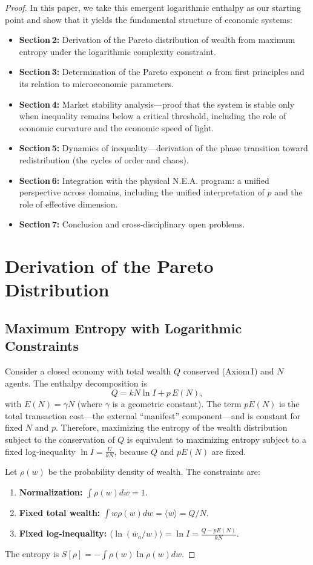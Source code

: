 \documentclass{article}
\begin{document}
\begin{proof}
In this paper, we take this emergent logarithmic enthalpy as our starting point and show that it yields the fundamental structure of economic systems:
\begin{itemize}
    \item \textbf{Section 2:} Derivation of the Pareto distribution of wealth from maximum entropy under the logarithmic complexity constraint.
    \item \textbf{Section 3:} Determination of the Pareto exponent $\alpha$ from first principles and its relation to microeconomic parameters.
    \item \textbf{Section 4:} Market stability analysis—proof that the system is stable only when inequality remains below a critical threshold, including the role of economic curvature and the economic speed of light.
    \item \textbf{Section 5:} Dynamics of inequality—derivation of the phase transition toward redistribution (the cycles of order and chaos).
    \item \textbf{Section 6:} Integration with the physical N.E.A. program: a unified perspective across domains, including the unified interpretation of $p$ and the role of effective dimension.
    \item \textbf{Section 7:} Conclusion and cross‑disciplinary open problems.
\end{itemize}

\section{Derivation of the Pareto Distribution}
\subsection{Maximum Entropy with Logarithmic Constraints}
Consider a closed economy with total wealth $Q$ conserved (Axiom I) and $N$ agents. The enthalpy decomposition is
\[
Q = k N \ln I + p\,E(N),
\]
with $E(N) = \gamma N$ (where $\gamma$ is a geometric constant). The term $pE(N)$ is the total transaction cost—the external “manifest” component—and is constant for fixed $N$ and $p$. Therefore, maximizing the entropy of the wealth distribution subject to the conservation of $Q$ is equivalent to maximizing entropy subject to a fixed log‑inequality $\ln I = \frac{U}{kN}$, because $Q$ and $pE(N)$ are fixed.

Let $\rho(w)$ be the probability density of wealth. The constraints are:
\begin{enumerate}
    \item \textbf{Normalization:} $\int \rho(w) dw = 1$.
    \item \textbf{Fixed total wealth:} $\int w \rho(w) dw = \langle w \rangle = Q/N$.
    \item \textbf{Fixed log‑inequality:} $\langle \ln (\bar{w}_a / w) \rangle = \ln I = \frac{Q - pE(N)}{kN}$.
\end{enumerate}
The entropy is $S[\rho] = -\int \rho(w) \ln \rho(w) dw$.


\end{proof}
\end{document}
